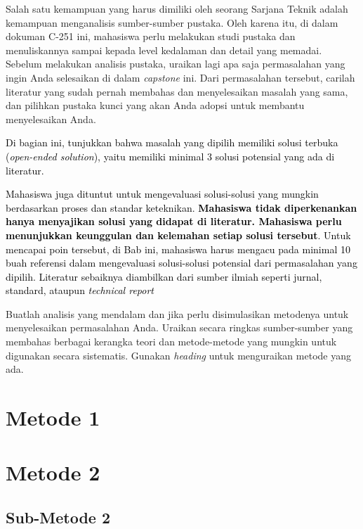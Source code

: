 

Salah satu kemampuan yang harus dimiliki oleh seorang Sarjana Teknik adalah kemampuan menganalisis sumber-sumber pustaka. Oleh karena itu, di dalam dokuman C-251 ini, mahasiswa perlu melakukan studi pustaka dan menuliskannya sampai kepada level kedalaman dan detail yang memadai. Sebelum melakukan analisis pustaka, uraikan lagi apa saja permasalahan yang ingin Anda selesaikan di dalam \textit{capstone} ini. Dari permasalahan tersebut, carilah literatur yang sudah pernah membahas dan menyelesaikan masalah yang sama, dan pilihkan pustaka kunci yang akan Anda adopsi untuk membantu menyelesaikan Anda. 

\textcolor{black}{Di bagian ini, tunjukkan bahwa masalah yang dipilih memiliki solusi terbuka (\textit{open-ended solution}), yaitu memiliki minimal 3 solusi potensial yang ada di literatur.}

\textcolor{black}{Mahasiswa juga dituntut untuk mengevaluasi solusi-solusi yang mungkin berdasarkan proses dan standar keteknikan. \textbf{Mahasiswa tidak diperkenankan hanya menyajikan solusi yang didapat di literatur. Mahasiswa perlu menunjukkan keunggulan dan kelemahan setiap solusi tersebut}. Untuk mencapai poin tersebut, di Bab ini, mahasiswa harus mengacu pada minimal 10 buah referensi dalam mengevaluasi solusi-solusi potensial dari permasalahan yang dipilih. Literatur sebaiknya diambilkan dari sumber ilmiah seperti jurnal, standard, ataupun \textit{technical report}
}

Buatlah analisis yang mendalam dan jika perlu disimulasikan metodenya untuk menyelesaikan permasalahan Anda. Uraikan secara ringkas sumber-sumber yang membahas berbagai kerangka teori dan metode-metode yang mungkin untuk digunakan secara sistematis. Gunakan \textit{heading} untuk menguraikan metode yang ada.


\section{Metode 1}
\label{sec:Metode_01}

    \lipsum[1-3]

\section{Metode 2}
\label{sec:Metode_02}

    \lipsum[4-6]
    
    \subsection{Sub-Metode 2}
    \label{subsec:Sub-Metode_02}
    
